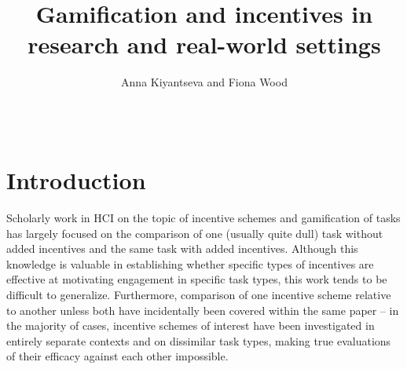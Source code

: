 \documentclass{sigchi}
\begin{document}
\title{Gamification and incentives in research and real-world settings}

\author{
  \alignauthor Anna Kiyantseva and Fiona Wood\\
    \\
    \\
    }


\maketitle

\begin{abstract}

\end{abstract}




\section{Introduction}

Scholarly work in HCI on the topic of incentive schemes and gamification of tasks has largely focused on the comparison of one (usually quite dull) task without added incentives and the same task with added incentives. Although this knowledge is valuable in establishing whether specific types of incentives are effective at motivating engagement in specific task types, this work tends to be difficult to generalize. Furthermore, comparison of one incentive scheme relative to another unless both have incidentally been covered within the same paper -- in the majority of cases, incentive schemes of interest have been investigated in entirely separate contexts and on dissimilar task types, making true evaluations of their efficacy against each other impossible.
\end{document}
